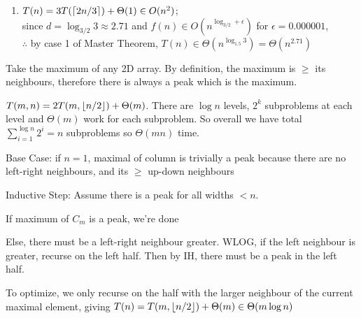 \documentclass[12pt, a4paper]{article}
\begin{document}
\begin{enumerate}[Q\arabic*).]
\begin{enumerate}[(\alph*)]
      \item $T(n) = 3T(\lceil 2n /3 \rceil) + \Theta(1) \in O(n^2)$;\\since $d = \log_{3/2}{3} \approx 2.71$ and $f(n) \in O(n^{\log_{3 /2}+\epsilon})$ for $\epsilon = 0.000001$,\\$\therefore$ by case 1 of Master Theorem, $T(n) \in \Theta(n^{\log_{1.5}3}) = \Theta(n^{2.71})$
    \end{enumerate}

  \item Take the maximum of any 2D array. By definition, the maximum is $\geq$ its neighbours, therefore there is always a peak which is the maximum.

  \item $T(m, n) = 2T(m, \lfloor n /2 \rfloor) + \Theta(m)$. There are $\log n$ levels, $2^k$ subproblems at each level and $\Theta(m)$ work for each subproblem. So overall we have total $\sum^{\log n}_{i=1}2^i = n$ subproblems so $\Theta(mn)$ time. 

  \item 
    \begin{enumproof}
    \item Base Case: if $n = 1$, maximal of column is trivially a peak because there are no left-right neighbours, and its $\geq$ up-down neighbours  
    \item Inductive Step: Assume there is a peak for all widths $< n$.
      \begin{enumproof}
      \item If maximum of $C_m$ is a peak, we're done
      \item Else, there must be a left-right neighbour greater. WLOG, if the left neighbour is greater, recurse on the left half. Then by IH, there must be a peak in the left half.
      \end{enumproof}
    \end{enumproof}
    To optimize, we only recurse on the half with the larger neighbour of the current maximal element, giving $T(n) = T(m, \lfloor n /2 \rfloor) + \Theta(m) \in \Theta(m\log n)$ 

\end{enumerate}
\end{document}
